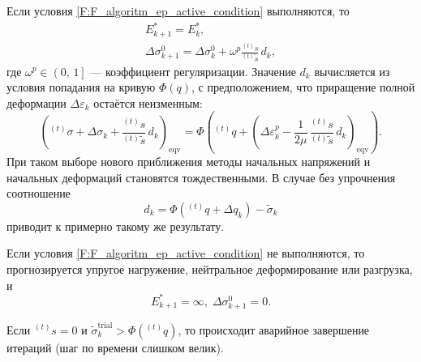 \documentclass[]{article}
\begin{document}
\begin{enumerate}
	Если условия \eqref{F:F_algoritm_ep_active_condition} выполняются, то
	\begin{equation}
	\begin{gathered}
	E_{k+1}^*=E_k^*,\\
	\Delta\sigma_{k+1}^0=\Delta\sigma_{k}^0+\omega^{p}\frac{{}^{(t)}s}{{}^{(t)}\tilde{s}}\,d_k,
	\label{F:F_algoritm_ep_new_active}
	\end{gathered}
	\end{equation}
	где $\omega^{p}\in\left(0,\,1\right]$ --- коэффициент регуляризации. Значение $d_k$ вычисляется из условия попадания на кривую $\Phi\left(q\right)$, с предположением, что приращение полной деформации $\Delta\varepsilon_k$ остаётся неизменным:
	\begin{equation}
	\left({}^{(t)}\sigma+\Delta\sigma_k+\frac{{}^{(t)}s}{{}^{(t)}\tilde{s}}\,d_k\right)_{\mathrm{eqv}}=\Phi\left({}^{(t)}q+\left(\Delta\varepsilon_k^p-\frac{1}{2\mu}\,\frac{{}^{(t)}s}{{}^{(t)}\tilde{s}}\,d_k \right)_{\mathrm{eqv}} \right).
	\end{equation}
	При таком выборе нового приближения методы начальных напряжений и начальных деформаций становятся тождественными. В случае без упрочнения соотношение
	\begin{equation}
	d_k=\Phi\left({}^{(t)}q+\Delta q_k\right)-\tilde{\sigma}_k
	\end{equation}
	приводит к примерно такому же результату.

	Если условия \eqref{F:F_algoritm_ep_active_condition} не выполняются, то прогнозируется упругое нагружение, нейтральное деформирование или разгрузка, и
	\begin{equation}
	E_{k+1}^*=\infty,\; \Delta\sigma_{k+1}^0=0.
	\label{F:F_algoritm_ep_new_unload}
	\end{equation}
	
	Если ${}^{(t)}s=0$ и $\tilde{\sigma}_k^{\mathrm{trial}}>\Phi\left({}^{(t)}q\right)$, то происходит аварийное завершение итераций (шаг по времени слишком велик).
	

\end{enumerate}
\end{document}
